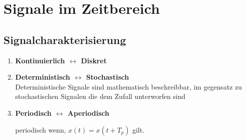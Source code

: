 \section{Signale im Zeitbereich}
  \subsection{Signalcharakterisierung}
  \begin{enumerate}
      \item{\textbf{Kontinuierlich \hfill $\longleftrightarrow$ \hfill Diskret}}
      \item{\textbf{Deterministisch \hfill $\longleftrightarrow$ \hfill Stochastisch}}\\
          Deterministische Signale sind mathematisch beschreibbar, im gegensatz
          zu stochastischen Signalen die dem Zufall unterworfen sind
      \item{\textbf{Periodisch \hfill $\longleftrightarrow$ \hfill Aperiodisch}}\\
          \begin{mdframed}[style=exercise]
              periodisch wenn, $x(t)=x(t+T_p)$ gilt.


\end{mdframed}
\end{enumerate}
